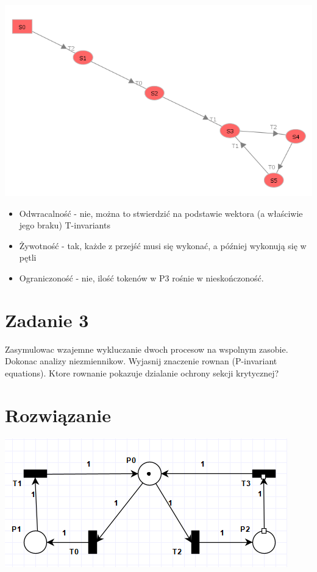 \documentclass[12pt]{article}
\begin{document}
\begin{center}
\centering
    \includegraphics{zad2_reach.png}
\end{center}

\begin{itemize}
    \item Odwracalność - nie, można to stwierdzić na podstawie wektora (a właściwie jego braku) T-invariants
    \item Żywotność - tak, każde z przejść musi się wykonać, a później wykonują się w pętli
    \item Ograniczoność - nie, ilość tokenów w P3 rośnie w nieskończoność.
\end{itemize}

\section{Zadanie 3}
Zasymulowac wzajemne wykluczanie dwoch procesow na wspolnym zasobie. Dokonac analizy niezmiennikow. Wyjasnij znaczenie rownan (P-invariant equations). Ktore rownanie pokazuje dzialanie ochrony sekcji krytycznej?

\section{Rozwiązanie}
\begin{center}
\centering
    \includegraphics{zad3_init.png}
\end{center}
\end{document}
